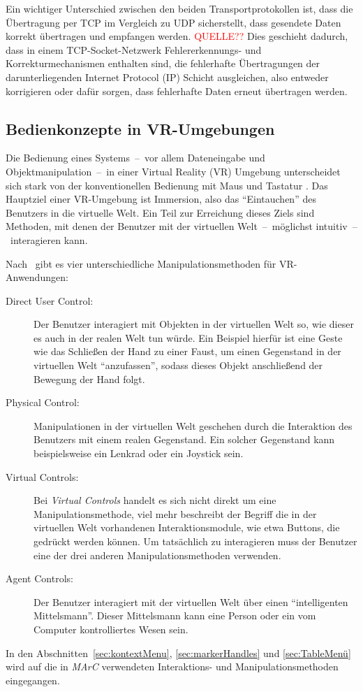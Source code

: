 Ein wichtiger Unterschied zwischen den beiden Transportprotokollen ist, dass die Übertragung per TCP im Vergleich zu UDP sicherstellt, dass gesendete Daten korrekt übertragen und empfangen werden. \textcolor{red}{QUELLE??} Dies geschieht dadurch, dass in einem TCP-Socket-Netzwerk Fehlererkennungs- und Korrekturmechanismen enthalten sind, die fehlerhafte Übertragungen der darunterliegenden Internet Protocol (IP) Schicht ausgleichen, also entweder korrigieren oder dafür sorgen, dass fehlerhafte Daten erneut übertragen werden.

\subsection{Bedienkonzepte in VR-Umgebungen}\label{sec:MenüAnwendungen}
Die Bedienung eines Systems~--~vor allem Dateneingabe und Objektmanipulation~--~in einer Virtual Reality (VR) Umgebung unterscheidet sich stark von der konventionellen Bedienung mit Maus und Tastatur \cite{chu1997multi}. Das Hauptziel einer VR-Umgebung ist Immersion, also das "`Eintauchen"' des Benutzers in die virtuelle Welt. Ein Teil zur Erreichung dieses Ziels sind Methoden, mit denen der Benutzer mit der virtuellen Welt~--~möglichst intuitiv~--~interagieren kann.

Nach~\cite{sherman2002understanding} gibt es vier unterschiedliche Manipulationsmethoden für VR-An\-wen\-dung\-en:
\begin{description}
	\item[Direct User Control:] Der Benutzer interagiert mit Objekten in der virtuellen Welt so, wie dieser es auch in der realen Welt tun würde. Ein Beispiel hierfür ist eine Geste wie das Schließen der Hand zu einer Faust, um einen Gegenstand in der virtuellen Welt "`anzufassen"', sodass dieses Objekt anschließend der Bewegung der Hand folgt.
	\item[Physical Control:] Manipulationen in der virtuellen Welt geschehen durch die Interaktion des Benutzers mit einem realen Gegenstand. Ein solcher Gegenstand kann beispielsweise ein Lenkrad oder ein Joystick sein.
	\item[Virtual Controls:] Bei \emph{Virtual Controls} handelt es sich nicht direkt um eine Manipulationsmethode, viel mehr beschreibt der Begriff die in der virtuellen Welt vorhandenen Interaktionsmodule, wie etwa Buttons, die gedrückt werden können. Um tatsächlich zu interagieren muss der Benutzer eine der drei anderen Manipulationsmethoden verwenden.
	\item[Agent Controls:] Der Benutzer interagiert mit der virtuellen Welt über einen "`intelligenten Mittelsmann"'. Dieser Mittelsmann kann eine Person oder ein vom Computer kontrolliertes Wesen sein.
\end{description}
In den Abschnitten~\ref{sec:kontextMenu}, \ref{sec:markerHandles} und \ref{sec:TableMenü} wird auf die in \emph{MArC} verwendeten Interaktions- und Manipulationsmethoden eingegangen.

